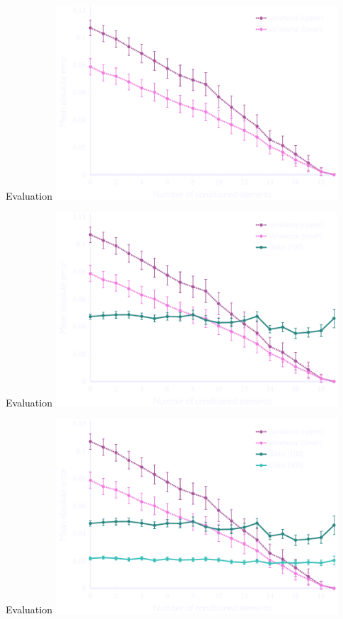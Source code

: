 \documentclass[mathserif]{beamer}
\begin{document}
\begin{frame}{Evaluation}
\vspace{1em}
\centering
\includegraphics[width=4.15in,trim=6 0 0 0,clip]{figures/floc_2.pdf}
\end{frame}

\begin{frame}{Evaluation}
\vspace{1em}
\centering
\includegraphics[width=4.15in,trim=6 0 0 0,clip]{figures/floc_3.pdf}
\end{frame}

\begin{frame}{Evaluation}
\vspace{1em}
\centering
\includegraphics[width=4.15in,trim=6 0 0 0,clip]{figures/floc_4.pdf}
\end{frame}
\end{document}
